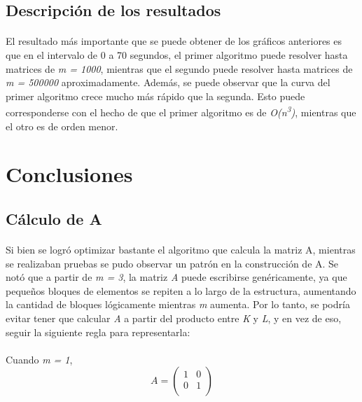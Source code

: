 \documentclass[a4paper,11pt]{article}
\begin{document}
\subsection{Descripci\'on de los resultados}
\paragraph{}
El resultado m\'as importante que se puede obtener de los gr\'aficos anteriores es que en el intervalo de 0 a 70 segundos, el primer algoritmo puede resolver hasta matrices de \emph{m = 1000}, mientras que el segundo puede resolver hasta matrices de \emph{m = 500000} aproximadamente.
Adem\'as, se puede observar que la curva del primer algoritmo crece mucho m\'as r\'apido que la segunda. Esto puede corresponderse con el hecho de que el primer algoritmo es de \emph{O(n\textsuperscript{3})}, mientras que el otro es de orden menor.

\newpage
\section{Conclusiones}
\subsection{C\'alculo de A}
\paragraph{}
Si bien se logr\'o optimizar bastante el algoritmo que calcula la matriz A, mientras se realizaban pruebas se pudo observar un patr\'on en la construcci\'on de A. Se not\'o que a partir de \emph{m = 3}, la matriz \emph{A} puede escribirse gen\'ericamente, ya que pequeños bloques de elementos se repiten a lo largo de la estructura, aumentando la cantidad de bloques l\'ogicamente mientras \emph{m} aumenta. Por lo tanto, se podr\'ia evitar tener que calcular \emph{A} a partir del producto entre \emph{K} y \emph{L}, y en vez de eso, seguir la siguiente regla para representarla:

\paragraph{}
Cuando \emph{m = 1},
\begin{equation} \label{matrizM1}
A =
\left( \begin{array}{cc}
1 & 0\\
0 & 1\\
\end{array} \right)
\end{equation}
\end{document}
